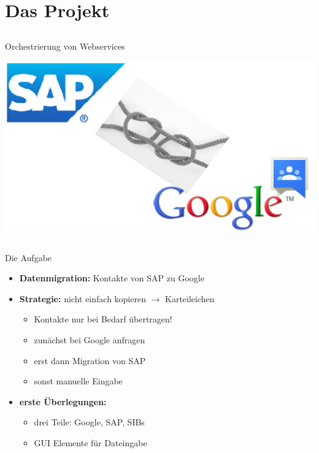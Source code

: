 \section{Das Projekt}

\subsection*{}
\begin{frame}{Orchestrierung von Webservices}
	
\begin{center}
\includegraphics[width=\textheight]{Bilder/titel_einfuehrung_logos.png} 
\end{center}

\end{frame}

\subsection*{}
\begin{frame}{Die Aufgabe}
\begin{itemize}[<+->]
	\item \textbf{Datenmigration:} Kontakte von SAP zu Google
	\pause
	\item \textbf{Strategie:} nicht einfach kopieren $\rightarrow$ Karteileichen
		\begin{itemize}[<+->]
			\item Kontakte nur bei Bedarf übertragen!
			\pause
			\item zunächst bei Google anfragen
			\item erst dann Migration von SAP
			\item sonst manuelle Eingabe
		\end{itemize}
	\pause
	\item \textbf{erste Überlegungen:}
		\begin{itemize}[<+->]
			\item drei Teile: Google, SAP, SIBs
			\item GUI Elemente für Dateingabe
		\end{itemize}

\end{itemize}
\end{frame}


